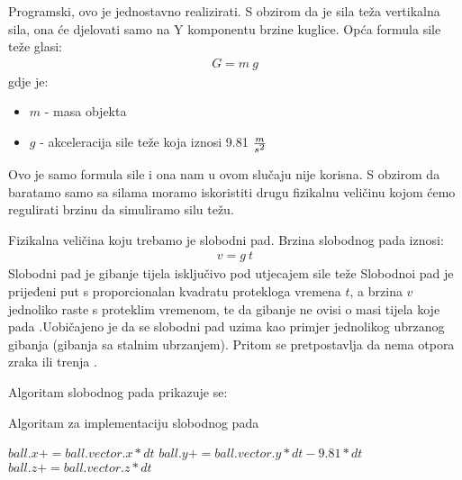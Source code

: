 Programski, ovo je jednostavno realizirati. S obzirom da je sila teža vertikalna sila, ona će djelovati samo na Y komponentu brzine kuglice. Opća formula sile teže glasi:
\begin{equation} \label{equ:sila_teza}
	\begin{aligned}
		G = m \ g
	\end{aligned}
\end{equation}
gdje je:
\begin{itemize}
	\item $m$ - masa objekta
	\item $g$ - akceleracija sile teže koja iznosi 9.81 $\frac{m}{s\textsuperscript{2}}$
\end{itemize}
Ovo je samo formula sile i ona nam u ovom slučaju nije korisna. S obzirom da baratamo samo sa silama moramo iskoristiti drugu fizikalnu veličinu kojom ćemo regulirati brzinu da simuliramo silu težu. 

Fizikalna veličina koju trebamo je slobodni pad. Brzina slobodnog pada iznosi:
\begin{equation}\label{slobodni_pad}
	\begin{aligned}
		v = g \ t
	\end{aligned}
\end{equation}
Slobodni pad je gibanje tijela isključivo pod utjecajem sile teže Slobodnoi pad je prijeđeni put s proporcionalan kvadratu protekloga vremena $t$, a brzina $v$ jednoliko raste s proteklim vremenom, te da gibanje ne ovisi o masi tijela koje pada \cite{10}.Uobičajeno je da se slobodni pad uzima kao primjer jednolikog ubrzanog gibanja (gibanja sa stalnim ubrzanjem). Pritom se pretpostavlja da nema otpora zraka ili trenja \cite{10}.

Algoritam slobodnog pada prikazuje se:
\begin{algorithm}
	\caption{Algoritam za implementaciju slobodnog pada}
	\label{alg:free_fall}
	\begin{algorithmic}
		\State $ball.x += ball.vector.x * dt$
		\State $ball.y += ball.vector.y * dt - 9.81 * dt$
		\State $ball.z += ball.vector.z * dt$
		\EndFunction
	\end{algorithmic}
\end{algorithm}

